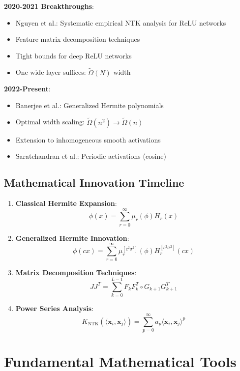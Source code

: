 \documentclass{article}
\newcommand{\x}{\mathbf{x}}
\newcommand{\TildeOmega}{\tilde{\Omega}}
\begin{document}
\textbf{2020-2021 Breakthroughs}:
\begin{itemize}
    \item Nguyen et al.: Systematic empirical NTK analysis for ReLU networks
    \item Feature matrix decomposition techniques
    \item Tight bounds for deep ReLU networks
    \item One wide layer suffices: $\TildeOmega(N)$ width
\end{itemize}

\textbf{2022-Present}:
\begin{itemize}
    \item Banerjee et al.: Generalized Hermite polynomials
    \item Optimal width scaling: $\TildeOmega(n^2) \rightarrow \TildeOmega(n)$
    \item Extension to inhomogeneous smooth activations
    \item Saratchandran et al.: Periodic activations (cosine)
\end{itemize}

\subsection{Mathematical Innovation Timeline}

\begin{enumerate}
    \item \textbf{Classical Hermite Expansion}:
    $$\phi(x) = \sum_{r=0}^{\infty} \mu_r(\phi) H_r(x)$$
    
    \item \textbf{Generalized Hermite Innovation}:
    $$\phi(cx) = \sum_{r=0}^{\infty} \mu_r^{[c^2\sigma^2]}(\phi) H_r^{[c^2\sigma^2]}(cx)$$
    
    \item \textbf{Matrix Decomposition Techniques}:
    $$JJ^T = \sum_{k=0}^{L-1} F_k F_k^T \circ G_{k+1} G_{k+1}^T$$
    
    \item \textbf{Power Series Analysis}:
    $$K_{\text{NTK}}(\langle \x_i, \x_j \rangle) = \sum_{p=0}^{\infty} a_p \langle \x_i, \x_j \rangle^p$$
\end{enumerate}

\section{Fundamental Mathematical Tools}
\end{document}
